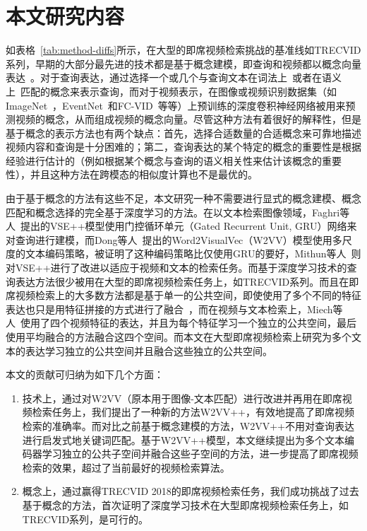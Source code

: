 \section{本文研究内容}
如表格~\ref{tab:method-diffs}所示，在大型的即席视频检索挑战的基准线如TRECVID系列，早期的大部分最先进的技术都是基于概念建模，即查询和视频都以概念向量表达~\cite{le2016nii,foteini2016iti,nguyen2017vireo,ueki2017waseda}。对于查询表达，通过选择一个或几个与查询文本在词法上~\cite{lu2016event,ueki2017waseda}或者在语义上~\cite{markatopoulou2017query,snoek2017university}匹配的概念来表示查询，而对于视频表示，在图像或视频识别数据集（如ImageNet~\cite{deng2009imagenet}，EventNet~\cite{ye2015eventnet}和FC-VID~\cite{jiang2018exploiting}等等）上预训练的深度卷积神经网络被用来预测视频的概念，从而组成视频的概念向量。尽管这种方法有着很好的解释性，但是基于概念的表示方法也有两个缺点：首先，选择合适数量的合适概念来可靠地描述视频内容和查询是十分困难的；第二，查询表达的某个特定的概念的重要性是根据经验进行估计的（例如根据某个概念与查询的语义相关性来估计该概念的重要性），并且这种方法在跨模态的相似度计算也不是最优的。

由于基于概念的方法有这些不足，本文研究一种不需要进行显式的概念建模、概念匹配和概念选择的完全基于深度学习的方法。在以文本检索图像领域，Faghri等人~\cite{faghri2017vse++}提出的VSE++模型使用门控循环单元（Gated Recurrent Unit, GRU）网络来对查询进行建模，而Dong等人~\cite{dong2018predicting}提出的Word2VisualVec（W2VV）模型使用多尺度的文本编码策略，被证明了这种编码策略比仅使用GRU的要好，Mithun等人~\cite{mithun2018learning}则对VSE++进行了改进以适应于视频和文本的检索任务。而基于深度学习技术的查询表达方法很少被用在大型的即席视频检索任务上，如TRECVID系列。而且在即席视频检索上的大多数方法都是基于单一的公共空间，即使使用了多个不同的特征表达也只是用特征拼接的方式进行了融合~\cite{li2018renmin,wu2019hybrid}，而在视频与文本检索上，Miech等人~\cite{miech2018learning}使用了四个视频特征的表达，并且为每个特征学习一个独立的公共空间，最后使用平均融合的方法融合这四个空间。而本文在大型即席视频检索上研究为多个文本的表达学习独立的公共空间并且融合这些独立的公共空间。

本文的贡献可归纳为如下几个方面：
\begin{enumerate}[1.]
\item 技术上，通过对W2VV（原本用于图像-文本匹配）进行改进并再用在即席视频检索任务上，我们提出了一种新的方法W2VV++，有效地提高了即席视频检索的准确率。而对比之前基于概念建模的方法，W2VV++不用对查询表达进行启发式地关键词匹配。基于W2VV++模型，本文继续提出为多个文本编码器学习独立的公共子空间并融合这些子空间的方法，进一步提高了即席视频检索的效果，超过了当前最好的视频检索算法。

\item 概念上，通过赢得TRECVID 2018的即席视频检索任务，我们成功挑战了过去基于概念的方法，首次证明了深度学习技术在大型即席视频检索任务上，如TRECVID系列，是可行的。

\end{enumerate}

